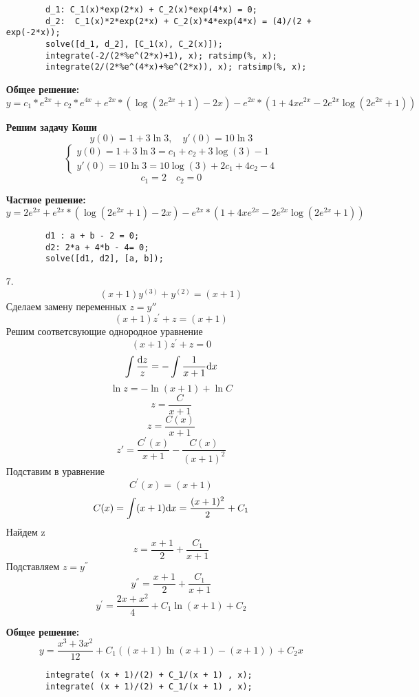 \documentclass[a4paper, 12pt, oneside]{scrartcl}
\begin{document}
\begin{enumerate}
		\begin{verbatim}		
		d_1: C_1(x)*exp(2*x) + C_2(x)*exp(4*x) = 0;
		d_2:  C_1(x)*2*exp(2*x) + C_2(x)*4*exp(4*x) = (4)/(2 + exp(-2*x));
		solve([d_1, d_2], [C_1(x), C_2(x)]);
		integrate(-2/(2*%e^(2*x)+1), x); ratsimp(%, x);
		integrate(2/(2*%e^(4*x)+%e^(2*x)), x); ratsimp(%, x);
		\end{verbatim}

		\textbf{Общее решение: }
		$$ y = c_1 * e^{2x} +  c_2 * e^{4x} + e^{2x} * (\log{(2e^{2x}+1)} - 2x) - e^{2x} * (1+4xe^{2x} - 2e^{2x}\log{(2e^{2x}+1)}) $$

		\textbf{Решим задачу Коши}
		$$  y(0) = 1 + 3\ln{3}, \quad y'(0) = 10\ln{3} $$
		\begin{equation*}
		  	\begin{cases}
   				y(0)  = 1 + 3\ln{3} = c_1 +  c_2  + 3\log{(3)} - 1 \\
				y'(0) = 10\ln{3} = 10\log{(3) + 2c_1 + 4c_2 - 4} 
   			\end{cases}
		\end{equation*}
		$$ c_1 = 2 \quad c_2 = 0 $$

		\textbf{Частное решение: }
		$$ y = 2e^{2x} + e^{2x} * (\log{(2e^{2x}+1)} - 2x) - e^{2x} * (1+4xe^{2x} - 2e^{2x}\log{(2e^{2x}+1)}) $$
		\begin{verbatim}		
		d1 : a + b - 2 = 0;
		d2: 2*a + 4*b - 4= 0;
		solve([d1, d2], [a, b]);
		\end{verbatim}

		\item[7.]
		$$ (x + 1)y^{(3)} + y^{(2)} = (x + 1) $$
		Сделаем замену переменных $z = y''$ \\ 
		$$ (x + 1)z^{'} + z = (x + 1) $$
		Решим соответсвующие однородное уравнение \\
		$$ (x + 1)z^{'} + z = 0 $$
		$$ \int \frac{\mathrm{d} z}{z} = -\int \frac{1}{x + 1} \mathrm{d} x $$
		$$ \ln{z} = -\ln{(x + 1)} + \ln{C} $$ 
		$$ z  = \frac{C}{x + 1} $$ 
		$$ z  = \frac{C(x)}{x + 1} $$ 
		$$ z'  = \frac{C^{'}(x)}{x + 1} - \frac{C(x)}{(x + 1)^{2}} $$ 
		Подставим в уравнение \\ 
		$$ C^{'}(x) = (x + 1) $$
		$$ C(x) = \int (x + 1) \mathrm{d} x = \frac{(x + 1)^{2}}{2} + C_{1} $$
		Найдем z \\ 
		$$ z  = \frac{x + 1}{2} + \frac{C_{1}}{x + 1} $$ 
		Подставляем $z = y^{''}$ \\
		$$ y^{''}  = \frac{x + 1}{2} + \frac{C_{1}}{x + 1} $$ 
		$$ y^{'}  = \frac{2x+x^{2}}{4} + C_{1}\ln{(x + 1)} + C_{2} $$ 
		
		\textbf{Общее решение: }
		$$ y = \frac{x^{3} + 3x^{2}}{12} + C_{1}((x + 1)\ln{(x + 1)} - (x + 1)) + C_{2}x $$ 
		\begin{verbatim}		
		integrate( (x + 1)/(2) + C_1/(x + 1) , x);
		integrate( (x + 1)/(2) + C_1/(x + 1) , x);
		\end{verbatim}

	\end{enumerate}
\end{document}
